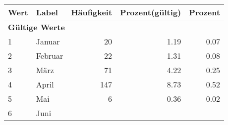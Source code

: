      \begin{longtable}{lXrrr}
     \toprule
     \textbf{Wert} & \textbf{Label} & \textbf{Häufigkeit} & \textbf{Prozent(gültig)} & \textbf{Prozent} \\
     \endhead
     \midrule
     \multicolumn{5}{l}{\textbf{Gültige Werte}}\\

     1 &
     \multicolumn{1}{X}{ Januar   } &


       \num{20} &
       \num[round-mode=places,round-precision=2]{1.19} &
         \num[round-mode=places,round-precision=2]{0.07} \\

     2 &
     \multicolumn{1}{X}{ Februar   } &


       \num{22} &
       \num[round-mode=places,round-precision=2]{1.31} &
         \num[round-mode=places,round-precision=2]{0.08} \\

     3 &
     \multicolumn{1}{X}{ März   } &


       \num{71} &
       \num[round-mode=places,round-precision=2]{4.22} &
         \num[round-mode=places,round-precision=2]{0.25} \\

     4 &
     \multicolumn{1}{X}{ April   } &


       \num{147} &
       \num[round-mode=places,round-precision=2]{8.73} &
         \num[round-mode=places,round-precision=2]{0.52} \\

     5 &
     \multicolumn{1}{X}{ Mai   } &


       \num{6} &
       \num[round-mode=places,round-precision=2]{0.36} &
         \num[round-mode=places,round-precision=2]{0.02} \\

     6 &
     \multicolumn{1}{X}{ Juni   } &



\end{longtable}

